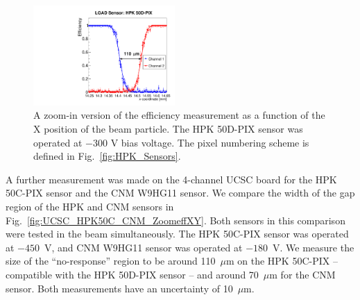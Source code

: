 \documentclass[preprint,1p]{elsarticle}
\begin{document}
\begin{figure}[!htbp] 
\centering
\includegraphics[width=0.48\textwidth]{figs/KUBoard_HPK50DPix_Run638-781/Eff_vs_X_HPK50DPIX_Ch1_2_fit.pdf} 
\caption{A zoom-in version of the efficiency measurement as a function of the X position of the beam particle.
The HPK 50D-PIX sensor was operated at $-300$ V bias voltage. The pixel numbering scheme is defined in Fig.~\ref{fig:HPK_Sensors}.} 
\label{fig:FNAL_HPK50_ZoomeffXY} 
\end{figure} 

A further measurement was made on the 4-channel UCSC board for the
HPK 50C-PIX sensor and the CNM W9HG11 sensor. 
We compare the width of the gap region of the HPK and CNM sensors in
Fig.~\ref{fig:UCSC_HPK50C_CNM_ZoomeffXY}. Both sensors in this
comparison were tested in the beam simultaneously. The HPK 50C-PIX sensor was operated 
at $-450$~V, and CNM W9HG11 sensor was operated at $-180$~V. We measure the
size of the ``no-response'' region to be around 110~$\mu$m on the HPK
50C-PIX -- compatible 
with the HPK 50D-PIX sensor -- and around 70~$\mu$m for the CNM sensor. Both
measurements have an uncertainty of 10~$\mu$m.
\end{document}
